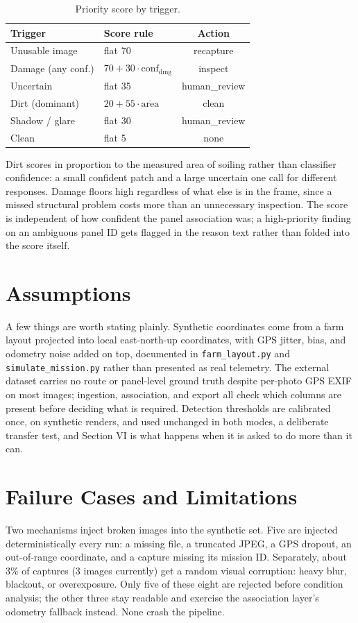 \documentclass[10pt,conference]{IEEEtran}
\begin{document}
\begin{table}[!t]
\centering
\caption{\footnotesize Priority score by trigger.}
\label{tab:priority}
\begin{tabularx}{\linewidth}{@{}lXc@{}}
\toprule
\textbf{Trigger} & \textbf{Score rule} & \textbf{Action}\\
\midrule
Unusable image & flat 70 & recapture\\
Damage (any conf.) & $70+30\cdot\text{conf}_{\text{dmg}}$ & inspect\\
Uncertain & flat 35 & human\_review\\
Dirt (dominant) & $20+55\cdot\overline{\text{area}}$ & clean\\
Shadow / glare & flat 30 & human\_review\\
Clean & flat 5 & none\\
\bottomrule
\end{tabularx}
\end{table}

Dirt scores in proportion to the measured area of soiling rather than classifier confidence: a small confident patch and a large uncertain one call for different responses. Damage floors high regardless of what else is in the frame, since a missed structural problem costs more than an unnecessary inspection. The score is independent of how confident the panel association was; a high-priority finding on an ambiguous panel ID gets flagged in the reason text rather than folded into the score itself.

\section{Assumptions}
A few things are worth stating plainly. Synthetic coordinates come from a farm layout projected into local east-north-up coordinates, with GPS jitter, bias, and odometry noise added on top, documented in \texttt{farm\_layout.py} and \texttt{simulate\_mission.py} rather than presented as real telemetry. The external dataset carries no route or panel-level ground truth despite per-photo GPS EXIF on most images; ingestion, association, and export all check which columns are present before deciding what is required. Detection thresholds are calibrated once, on synthetic renders, and used unchanged in both modes, a deliberate transfer test, and Section VI is what happens when it is asked to do more than it can.

\section{Failure Cases and Limitations}
Two mechanisms inject broken images into the synthetic set. Five are injected deterministically every run: a missing file, a truncated JPEG, a GPS dropout, an out-of-range coordinate, and a capture missing its mission ID. Separately, about 3\% of captures (3 images currently) get a random visual corruption: heavy blur, blackout, or overexposure. Only five of these eight are rejected before condition analysis; the other three stay readable and exercise the association layer's odometry fallback instead. None crash the pipeline.
\end{document}
